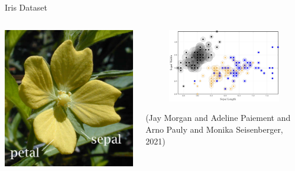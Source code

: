 \documentclass[smaller]{beamer}
\begin{document}
\begin{frame}[label={sec:org6697504}]{Iris Dataset}
\begin{columns}
\begin{column}{0.3\columnwidth}
\begin{center}
\includegraphics[width=1.0\textwidth]{images/Petal-sepal.jpg}
\end{center}
\end{column}

\begin{column}{0.7\columnwidth}
\begin{figure}
    \centering
    \includegraphics[width=\textwidth]{images/iris-eps.png}
    \label{fig:iris}
\end{figure}

(Jay Morgan and Adeline Paiement and Arno Pauly and Monika Seisenberger, 2021)
\end{column}
\end{columns}
\end{frame}
\end{document}
